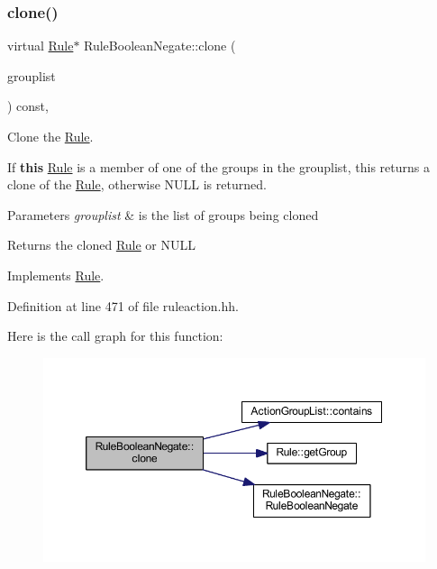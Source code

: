\subsubsection{\texorpdfstring{clone()}{clone()}}
{\footnotesize\ttfamily virtual \mbox{\hyperlink{class_rule}{Rule}}$\ast$ Rule\+Boolean\+Negate\+::clone (\begin{DoxyParamCaption}\item[{const \mbox{\hyperlink{class_action_group_list}{Action\+Group\+List}} \&}]{grouplist }\end{DoxyParamCaption}) const\hspace{0.3cm}{\ttfamily [inline]}, {\ttfamily [virtual]}}



Clone the \mbox{\hyperlink{class_rule}{Rule}}. 

If {\bfseries{this}} \mbox{\hyperlink{class_rule}{Rule}} is a member of one of the groups in the grouplist, this returns a clone of the \mbox{\hyperlink{class_rule}{Rule}}, otherwise N\+U\+LL is returned. 
\begin{DoxyParams}{Parameters}
{\em grouplist} & is the list of groups being cloned \\
\hline
\end{DoxyParams}
\begin{DoxyReturn}{Returns}
the cloned \mbox{\hyperlink{class_rule}{Rule}} or N\+U\+LL 
\end{DoxyReturn}


Implements \mbox{\hyperlink{class_rule_a70de90a76461bfa7ea0b575ce3c11e4d}{Rule}}.



Definition at line 471 of file ruleaction.\+hh.

Here is the call graph for this function\+:
\nopagebreak
\begin{figure}[H]
\begin{center}
\leavevmode
\includegraphics[width=350pt]{class_rule_boolean_negate_ad833fb025b67547a2da6df4ab5674ce1_cgraph}
\end{center}
\end{figure}
\mbox{\label{class_rule_boolean_negate_af6db5a859074d99716ce46daae31329c}} 
